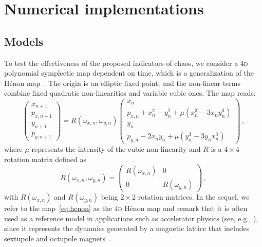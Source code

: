 %
\section{\label{sec:dyn:numerical_implementations} Numerical implementations}
%
\subsection{Models}
%
To test the effectiveness of the proposed indicators of chaos, we consider a 4\textsc{d} polynomial symplectic map dependent on time, which is a generalization of the Hénon map~\cite{Bazzani:262179}. The origin is an elliptic fixed point, and the non-linear terms combine fixed quadratic non-linearities and variable cubic ones. The map reads:
\begin{equation}
    \left(\begin{array}{c}
    x_{n+1} \\
    p_{x, n+1} \\
    y_{n+1} \\
    p_{y, n+1}
    \end{array}\right) =R(\omega_{x,n}, \omega_{y, n}) \left(\begin{array}{c}
    x_{n} \\
    p_{x, n}+x_{n}^{2}-y_{n}^{2} + \mu \left(x_{n}^{3} - 3x_{n}y_{n}^{3}\right) \\
    y_{n} \\
    p_{y, n}-2 x_{n} y_{n} + \mu \left(y_{n}^{3} - 3y_{n} x_{n}^{3}\right)
    \end{array}\right) \,,
    \label{eq:henon}
\end{equation}
where $\mu$ represents the intensity of the cubic non-linearity and $R$ is a $4\times 4$ rotation matrix defined as
\begin{equation}
    R(\omega_{x,n}, \omega_{y, n})=\left(\begin{array}{cc}
    R\left(\omega_{x, n}\right) & 0 \\
    0 & R\left(\omega_{y, n}\right)
    \end{array}\right) \,,
\end{equation}
with $R\left(\omega_{x, n}\right)$ and $R\left(\omega_{y, n}\right)$ being $2\times 2$ rotation matrices. In the sequel, we refer to the map~\eqref{eq:henon} as the 4\textsc{d} Hénon map and remark that it is often used as a reference model in applications such as accelerator physics (see, e.g., \cite{Bazzani:262179, invlog, Bazzani:2019csk}), since it represents the dynamics generated by a magnetic lattice that includes sextupole and octupole magnets~\cite{Bazzani:262179}.

